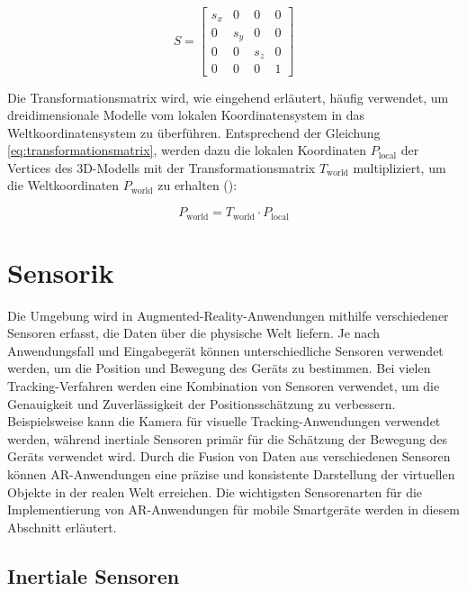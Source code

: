 \begin{equation}
    S = 
    \begin{bmatrix} 
        s_x & 0 & 0 & 0 \\ 
        0 & s_y & 0 & 0 \\ 
        0 & 0 & s_z & 0 \\ 
        0 & 0 & 0 & 1 
    \end{bmatrix}
\end{equation}

Die Transformationsmatrix wird, wie eingehend erläutert, häufig verwendet, um dreidimensionale Modelle vom lokalen Koordinatensystem in das Weltkoordinatensystem zu überführen. Entsprechend der Gleichung \ref{eq:transformationsmatrix}, werden dazu die lokalen Koordinaten \( P_{\text{local}} \) der Vertices des 3D-Modells mit der Transformationsmatrix \( T_{\text{world}} \) multipliziert, um die Weltkoordinaten \( P_{\text{world}} \) zu erhalten (\cite{doerner2022virtual, gao2021vSLAM, freescale2010math3d}):

\begin{equation}
    P_{\text{world}} = T_{\text{world}} \cdot P_{\text{local}}
\end{equation}

\section{Sensorik}

Die Umgebung wird in Augmented-Reality-Anwendungen mithilfe verschiedener Sensoren erfasst, die Daten über die physische Welt liefern. Je nach Anwendungsfall und Eingabegerät können unterschiedliche Sensoren verwendet werden, um die Position und Bewegung des Geräts zu bestimmen. Bei vielen Tracking-Verfahren werden eine Kombination von Sensoren verwendet, um die Genauigkeit und Zuverlässigkeit der Positionsschätzung zu verbessern. Beispielsweise kann die Kamera für visuelle Tracking-Anwendungen verwendet werden, während inertiale Sensoren primär für die Schätzung der Bewegung des Geräts verwendet wird. Durch die Fusion von Daten aus verschiedenen Sensoren können AR-Anwendungen eine präzise und konsistente Darstellung der virtuellen Objekte in der realen Welt erreichen. Die wichtigsten Sensorenarten für die Implementierung von AR-Anwendungen für mobile Smartgeräte werden in diesem Abschnitt erläutert. \cite{doerner2022virtual}

\subsection{Inertiale Sensoren}

